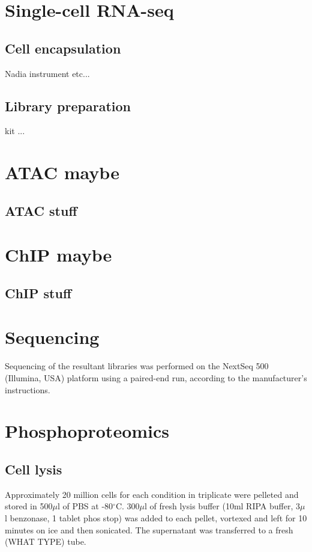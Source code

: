 \section{Single-cell RNA-seq}
\subsection{Cell encapsulation}
Nadia instrument etc...

\subsection{Library preparation}
kit ...

\section{ATAC maybe}
\subsection{ATAC stuff}

\section{ChIP maybe}
\subsection{ChIP stuff}

\section{Sequencing}
Sequencing of the resultant libraries was performed on the NextSeq 500 (Illumina, USA) platform using a paired-end run, according to the manufacturer's instructions.

%
\section{Phosphoproteomics}
%
\subsection{Cell lysis}
Approximately 20 million cells for each condition in triplicate were pelleted and stored in 500$\mu$l of PBS at -80$^{\circ}$C. 300$\mu$l of fresh lysis buffer (10ml RIPA buffer, 3$\mu$l benzonase, 1 tablet phos stop) was added to each pellet, vortexed and left for 10 minutes on ice and then sonicated. The supernatant was transferred to a fresh (WHAT TYPE) tube.

